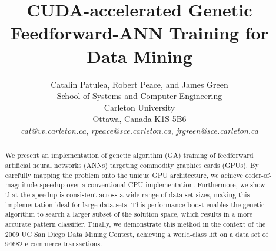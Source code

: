 \documentclass[11pt]{article}       %
\begin{document}


\title{CUDA-accelerated Genetic Feedforward-ANN Training for Data Mining}


\author{
Catalin Patulea, Robert Peace, and James Green\\
School of Systems and Computer Engineering\\
Carleton University\\
Ottawa, Canada K1S 5B6\\
{\em cat@vv.carleton.ca}, {\em rpeace@sce.carleton.ca}, {\em jrgreen@sce.carleton.ca}
} %

\maketitle

\begin{abstract}
We present an implementation of genetic algorithm (GA) training of feedforward artificial neural networks (ANNs) targeting commodity graphics cards (GPUs). By carefully mapping the problem onto the unique GPU architecture, we achieve order-of-magnitude speedup over a conventional CPU implementation. Furthermore, we show that the speedup is consistent across a wide range of data set sizes, making this implementation ideal for large data sets. This performance boost enables the genetic algorithm to search a larger subset of the solution space, which results in a more accurate pattern classifier. Finally, we demonstrate this method in the context of the 2009 UC San Diego Data Mining Contest, achieving a world-class lift on a data set of 94682 e-commerce transactions.
\end{abstract}

\end{document}
